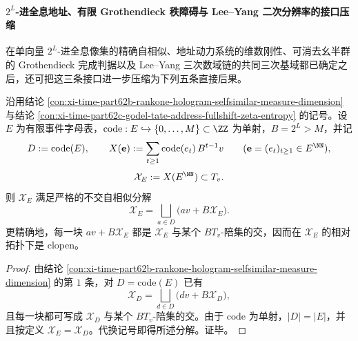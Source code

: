 \paragraph{\texorpdfstring{$2^L$}{2^L}-进全息地址、有限 Grothendieck 秩障碍与 Lee--Yang 二次分辨率的接口压缩}
在单向量 \(2^L\)-进全息像集的精确自相似、地址动力系统的维数刚性、可消去幺半群的 Grothendieck 完成判据以及 Lee--Yang 三次数域链的共同三次基域都已确定之后，还可把这三条接口进一步压缩为下列五条直接后果。

\begin{theorem}[全息地址像的严格不交自相似分解]\label{thm:xi-time-part62ca-holographic-address-strict-selfsimilarity}
沿用结论 \ref{con:xi-time-part62b-rankone-hologram-selfsimilar-measure-dimension} 与结论 \ref{con:xi-time-part62c-godel-tate-address-fullshift-zeta-entropy} 的记号。设 \(E\) 为有限事件字母表，\(\mathrm{code}:E\hookrightarrow\{0,\dots,M\}\subset\ZZ\) 为单射，\(B=2^L>M\)，并记
\[
D:=\mathrm{code}(E),
\qquad
X(\mathbf e):=\sum_{t\ge 1}\mathrm{code}(e_t)\,B^{t-1}v
\qquad
(\mathbf e=(e_t)_{t\ge 1}\in E^{\NN}),
\]
\[
\mathcal X_E:=X(E^{\NN})\subset T_v.
\]
则 \(\mathcal X_E\) 满足严格的不交自相似分解
\[
\mathcal X_E
=
\bigsqcup_{a\in D}\bigl(av+B\mathcal X_E\bigr).
\]
更精确地，每一块 \(av+B\mathcal X_E\) 都是 \(\mathcal X_E\) 与某个 \(BT_v\)-陪集的交，因而在 \(\mathcal X_E\) 的相对拓扑下是 clopen。
\end{theorem}
\begin{proof}
由结论 \ref{con:xi-time-part62b-rankone-hologram-selfsimilar-measure-dimension} 的第 \(1\) 条，对 \(D=\mathrm{code}(E)\) 已有
\[
\mathcal X_D=\bigsqcup_{d\in D}\bigl(dv+B\mathcal X_D\bigr),
\]
且每一块都可写成 \(\mathcal X_D\) 与某个 \(BT_v\)-陪集的交。由于 \(\mathrm{code}\) 为单射，\(|D|=|E|\)，并且按定义 \(\mathcal X_E=\mathcal X_D\)。代换记号即得所述分解。证毕。
\end{proof}

